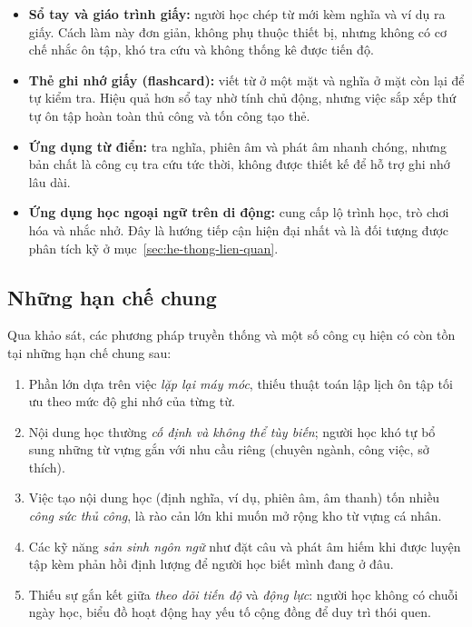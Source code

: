\begin{itemize}
  \item \textbf{Sổ tay và giáo trình giấy:} người học chép từ mới kèm
        nghĩa và ví dụ ra giấy. Cách làm này đơn giản, không phụ thuộc
        thiết bị, nhưng không có cơ chế nhắc ôn tập, khó tra cứu và không
        thống kê được tiến độ.
  \item \textbf{Thẻ ghi nhớ giấy (flashcard):} viết từ ở một mặt và nghĩa
        ở mặt còn lại để tự kiểm tra. Hiệu quả hơn sổ tay nhờ tính chủ
        động, nhưng việc sắp xếp thứ tự ôn tập hoàn toàn thủ công và tốn
        công tạo thẻ.
  \item \textbf{Ứng dụng từ điển:} tra nghĩa, phiên âm và phát âm nhanh
        chóng, nhưng bản chất là công cụ tra cứu tức thời, không được
        thiết kế để hỗ trợ ghi nhớ lâu dài.
  \item \textbf{Ứng dụng học ngoại ngữ trên di động:} cung cấp lộ trình
        học, trò chơi hóa và nhắc nhở. Đây là hướng tiếp cận hiện đại
        nhất và là đối tượng được phân tích kỹ ở mục~\ref{sec:he-thong-lien-quan}.
\end{itemize}

\subsection{Những hạn chế chung}

Qua khảo sát, các phương pháp truyền thống và một số công cụ hiện có còn
tồn tại những hạn chế chung sau:

\begin{enumerate}
  \item Phần lớn dựa trên việc \emph{lặp lại máy móc}, thiếu thuật toán
        lập lịch ôn tập tối ưu theo mức độ ghi nhớ của từng từ.
  \item Nội dung học thường \emph{cố định và không thể tùy biến}; người
        học khó tự bổ sung những từ vựng gắn với nhu cầu riêng (chuyên
        ngành, công việc, sở thích).
  \item Việc tạo nội dung học (định nghĩa, ví dụ, phiên âm, âm thanh) tốn
        nhiều \emph{công sức thủ công}, là rào cản lớn khi muốn mở rộng
        kho từ vựng cá nhân.
  \item Các kỹ năng \emph{sản sinh ngôn ngữ} như đặt câu và phát âm hiếm
        khi được luyện tập kèm phản hồi định lượng để người học biết mình
        đang ở đâu.
  \item Thiếu sự gắn kết giữa \emph{theo dõi tiến độ} và \emph{động lực}:
        người học không có chuỗi ngày học, biểu đồ hoạt động hay yếu tố
        cộng đồng để duy trì thói quen.
\end{enumerate}


